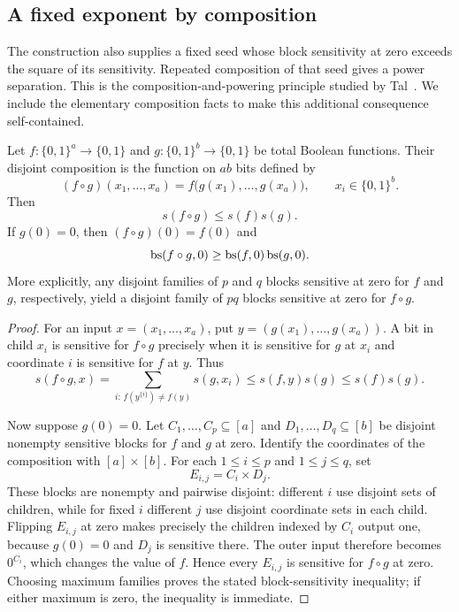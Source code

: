 \subsection{A fixed exponent by composition}

The construction also supplies a fixed seed whose block sensitivity at
zero exceeds the square of its sensitivity. Repeated composition of that
seed gives a power separation. This is the composition-and-powering
principle studied by Tal~\cite{Tal2013}. We include the elementary composition facts
to make this additional consequence self-contained.

\begin{lemma}
\label{lem:composition}
Let $f:\{0,1\}^a\to\{0,1\}$ and
$g:\{0,1\}^b\to\{0,1\}$ be total Boolean functions.
Their disjoint composition is the function on $ab$ bits defined by
\[
 (f\circ g)(x_1,\ldots,x_a)
   =f\bigl(g(x_1),\ldots,g(x_a)\bigr),
 \qquad x_i\in\{0,1\}^b.
\]
Then
\[
 s(f\circ g)\leq s(f)s(g).
\]
If $g(0)=0$, then $(f\circ g)(0)=f(0)$ and
\[
 \operatorname{bs}(f\circ g,0)\geq\operatorname{bs}(f,0)\operatorname{bs}(g,0).
\]
More explicitly, any disjoint families of $p$ and $q$ blocks sensitive at
zero for $f$ and $g$, respectively, yield a disjoint family of $pq$ blocks
sensitive at zero for $f\circ g$.
\end{lemma}

\begin{proof}
For an input $x=(x_1,\ldots,x_a)$, put
$y=(g(x_1),\ldots,g(x_a))$.
A bit in child $x_i$ is sensitive for $f\circ g$ precisely when it is
sensitive for $g$ at $x_i$ and coordinate $i$ is sensitive for $f$ at $y$.
Thus
\[
 s(f\circ g,x)
   =\sum_{i:\,f(y^{\{i\}})\ne f(y)}s(g,x_i)
   \leq s(f,y)s(g)
   \leq s(f)s(g).
\]

Now suppose $g(0)=0$. Let $C_1,\ldots,C_p\subseteq[a]$ and
$D_1,\ldots,D_q\subseteq[b]$ be disjoint nonempty sensitive blocks for
$f$ and $g$ at zero. Identify the coordinates of the composition with
$[a]\times[b]$. For each $1\leq i\leq p$ and $1\leq j\leq q$, set
\[
 E_{i,j}=C_i\times D_j.
\]
These blocks are nonempty and pairwise disjoint: different $i$ use
disjoint sets of children, while for fixed $i$ different $j$ use
disjoint coordinate sets in each child.
Flipping $E_{i,j}$ at zero makes precisely the children indexed by $C_i$
output one, because $g(0)=0$ and $D_j$ is sensitive there.
The outer input therefore becomes $0^{C_i}$, which changes the value of
$f$. Hence every $E_{i,j}$ is sensitive for $f\circ g$ at zero.
Choosing maximum families proves the stated block-sensitivity inequality;
if either maximum is zero, the inequality is immediate.
\end{proof}

